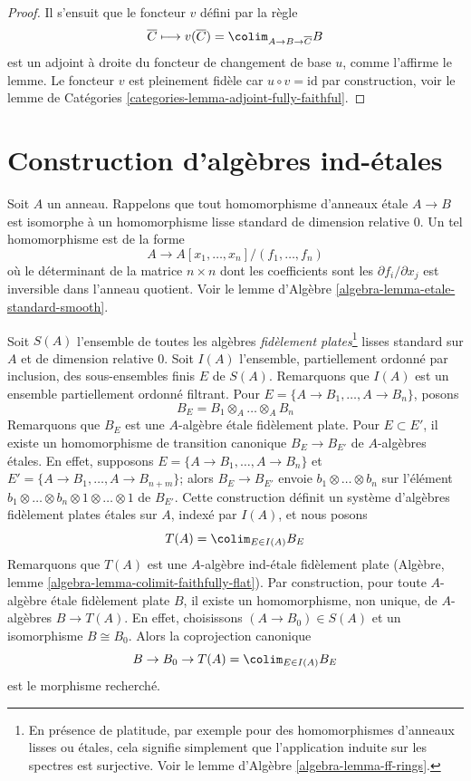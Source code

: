\begin{proof}
\medskip\noindent
Il s'ensuit que le foncteur $v$ défini par la règle
$$
\overline{C} 
\longmapsto
v(\overline{C}) = \colim_{A \to B \to \overline{C}} B
$$
est un adjoint à droite du foncteur de changement de base $u$, comme l'affirme le lemme.
Le foncteur $v$ est pleinement fidèle car
$u \circ v = \text{id}$ par construction, voir le
lemme de Catégories \ref{categories-lemma-adjoint-fully-faithful}.
\end{proof}









\section{Construction d'algèbres ind-\'etales}
\label{section-construction-ind-etale}

\noindent
Soit $A$ un anneau. Rappelons que tout homomorphisme d'anneaux \'etale $A \to B$ est isomorphe
à un homomorphisme lisse standard de dimension relative $0$. Un tel homomorphisme
est de la forme
$$
A \longrightarrow A[x_1, \ldots, x_n]/(f_1, \ldots, f_n)
$$
où le déterminant de la matrice $n \times n$ dont les coefficients sont les
$\partial f_i/\partial x_j$ est inversible dans l'anneau quotient. Voir le
lemme d'Algèbre \ref{algebra-lemma-etale-standard-smooth}.

\medskip\noindent
Soit $S(A)$ l'ensemble de toutes les algèbres {\it fidèlement plates}\footnote{En présence
de platitude, par exemple pour des homomorphismes d'anneaux lisses ou \'etales,
cela signifie simplement que l'application induite sur les spectres est surjective. Voir le
lemme d'Algèbre \ref{algebra-lemma-ff-rings}.}
lisses standard sur $A$ et de dimension relative $0$.
Soit $I(A)$ l'ensemble, partiellement ordonné par inclusion, des sous-ensembles finis
$E$ de $S(A)$. Remarquons que $I(A)$ est un ensemble partiellement ordonné
filtrant. Pour $E = \{A \to B_1, \ldots, A \to B_n\}$, posons
$$
B_E = B_1 \otimes_A \ldots \otimes_A B_n
$$
Remarquons que $B_E$ est une $A$-algèbre \'etale fidèlement plate.
Pour $E \subset E'$, il existe un homomorphisme de transition canonique $B_E \to B_{E'}$
de $A$-algèbres \'etales. En effet, supposons $E = \{A \to B_1, \ldots, A \to B_n\}$
et $E' = \{A \to B_1, \ldots, A \to B_{n + m}\}$; alors
$B_E \to B_{E'}$ envoie $b_1 \otimes \ldots \otimes b_n$ sur
l'élément $b_1 \otimes \ldots \otimes b_n \otimes 1 \otimes \ldots \otimes 1$
de $B_{E'}$. Cette construction définit un système d'algèbres fidèlement plates
\'etales sur $A$, indexé par $I(A)$, et nous posons
$$
T(A) = \colim_{E \in I(A)} B_E
$$
Remarquons que $T(A)$ est une $A$-algèbre ind-\'etale fidèlement plate
(Algèbre, lemme \ref{algebra-lemma-colimit-faithfully-flat}). Par construction,
pour toute $A$-algèbre \'etale fidèlement plate $B$, il existe un homomorphisme, non unique,
de $A$-algèbres $B \to T(A)$. En effet, choisissons $(A \to B_0) \in S(A)$
et un isomorphisme $B \cong B_0$. Alors la coprojection canonique
$$
B \to B_0 \to 
T(A) = \colim_{E \in I(A)} B_E
$$
est le morphisme recherché.

